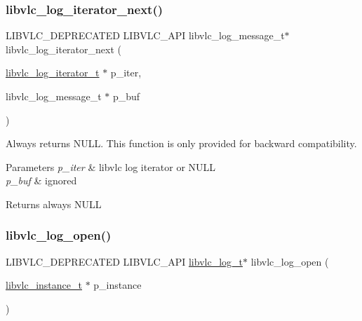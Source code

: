 \subsubsection{\texorpdfstring{libvlc\+\_\+log\+\_\+iterator\+\_\+next()}{libvlc\_log\_iterator\_next()}}
{\footnotesize\ttfamily L\+I\+B\+V\+L\+C\+\_\+\+D\+E\+P\+R\+E\+C\+A\+T\+ED L\+I\+B\+V\+L\+C\+\_\+\+A\+PI libvlc\+\_\+log\+\_\+message\+\_\+t$\ast$ libvlc\+\_\+log\+\_\+iterator\+\_\+next (\begin{DoxyParamCaption}\item[{\hyperlink{group__libvlc__log_ga5bc36e29d8021e6a8d06223ea2ce2262}{libvlc\+\_\+log\+\_\+iterator\+\_\+t} $\ast$}]{p\+\_\+iter,  }\item[{libvlc\+\_\+log\+\_\+message\+\_\+t $\ast$}]{p\+\_\+buf }\end{DoxyParamCaption})}

Always returns N\+U\+LL. This function is only provided for backward compatibility.


\begin{DoxyParams}{Parameters}
{\em p\+\_\+iter} & libvlc log iterator or N\+U\+LL \\
\hline
{\em p\+\_\+buf} & ignored \\
\hline
\end{DoxyParams}
\begin{DoxyReturn}{Returns}
always N\+U\+LL 
\end{DoxyReturn}
\mbox{\label{group__libvlc__log_ga95dd678e1ec9d77855e83b4f45b6d04d}} 
\subsubsection{\texorpdfstring{libvlc\+\_\+log\+\_\+open()}{libvlc\_log\_open()}}
{\footnotesize\ttfamily L\+I\+B\+V\+L\+C\+\_\+\+D\+E\+P\+R\+E\+C\+A\+T\+ED L\+I\+B\+V\+L\+C\+\_\+\+A\+PI \hyperlink{structvlc__log__t}{libvlc\+\_\+log\+\_\+t}$\ast$ libvlc\+\_\+log\+\_\+open (\begin{DoxyParamCaption}\item[{\hyperlink{group__libvlc__core_ga316d739a80da4678206c79f4d6c2e284}{libvlc\+\_\+instance\+\_\+t} $\ast$}]{p\+\_\+instance }\end{DoxyParamCaption})}


